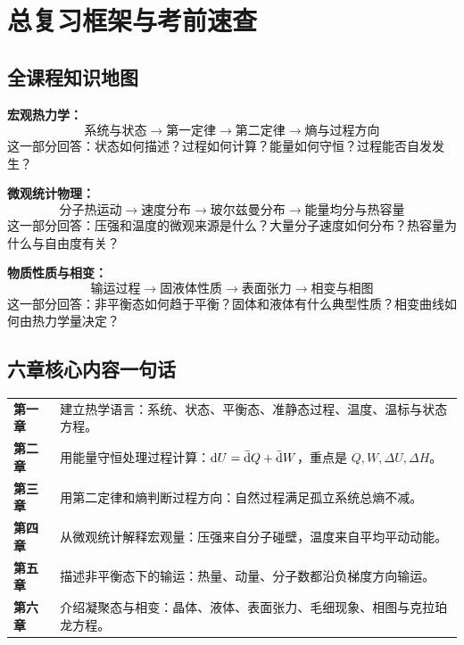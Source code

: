 \chapter{总复习框架与考前速查}


\section{全课程知识地图}

\begin{KeyBox}[热学B的三条主线]
\begin{ReviewList}
  \item \textbf{宏观热力学：}
  \[
    \text{系统与状态}
    \rightarrow
    \text{第一定律}
    \rightarrow
    \text{第二定律}
    \rightarrow
    \text{熵与过程方向}
  \]
  这一部分回答：状态如何描述？过程如何计算？能量如何守恒？过程能否自发发生？

  \item \textbf{微观统计物理：}
  \[
    \text{分子热运动}
    \rightarrow
    \text{速度分布}
    \rightarrow
    \text{玻尔兹曼分布}
    \rightarrow
    \text{能量均分与热容量}
  \]
  这一部分回答：压强和温度的微观来源是什么？大量分子速度如何分布？热容量为什么与自由度有关？

  \item \textbf{物质性质与相变：}
  \[
    \text{输运过程}
    \rightarrow
    \text{固液体性质}
    \rightarrow
    \text{表面张力}
    \rightarrow
    \text{相变与相图}
  \]
  这一部分回答：非平衡态如何趋于平衡？固体和液体有什么典型性质？相变曲线如何由热力学量决定？
\end{ReviewList}
\end{KeyBox}

\section{六章核心内容一句话}

\begin{FormulaBox}[章节主旨]
\begin{tabularx}{\textwidth}{@{}>{\bfseries}lX@{}}
第一章 & 建立热学语言：系统、状态、平衡态、准静态过程、温度、温标与状态方程。\\
第二章 & 用能量守恒处理过程计算：\(\mathop{}\!\mathrm{d} U=\mathop{}\!\bar{\mathrm{d}} Q+\mathop{}\!\bar{\mathrm{d}} W\)，重点是 \(Q,W,\Delta U,\Delta H\)。\\
第三章 & 用第二定律和熵判断过程方向：自然过程满足孤立系统总熵不减。\\
第四章 & 从微观统计解释宏观量：压强来自分子碰壁，温度来自平均平动动能。\\
第五章 & 描述非平衡态下的输运：热量、动量、分子数都沿负梯度方向输运。\\
第六章 & 介绍凝聚态与相变：晶体、液体、表面张力、毛细现象、相图与克拉珀龙方程。\\
\end{tabularx}
\end{FormulaBox}

